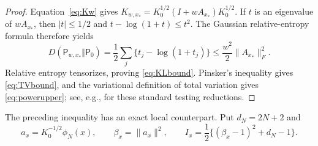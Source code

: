 \documentclass[11pt]{article}
\theoremstyle{definition}
\theoremstyle{remark}
\begin{document}
\begin{proof}
Equation~\eqref{eq:Kw} gives
$K_{w,x_*}=K_0^{1/2}(I+wA_{x_*})K_0^{1/2}$.  If $t$ is an eigenvalue of
$wA_{x_*}$, then
$|t|\leq1/2$ and $t-\log(1+t)\leq t^2$.  The Gaussian relative-entropy formula
therefore yields
\[
 D(\mathsf P_{w,x_*}\Vert\mathsf P_0)
 =\frac12\sum_j\{t_j-\log(1+t_j)\}
 \leq\frac{w^2}{2}\|A_{x_*}\|_F^2.
\]
Relative entropy tensorizes, proving \eqref{eq:KLbound}.  Pinsker's inequality
gives \eqref{eq:TVbound}, and the variational definition of total variation
gives \eqref{eq:powerupper}; see, e.g., \cite{Tsybakov2009} for these standard
testing reductions.
\end{proof}

The preceding inequality has an exact local counterpart.  Put
$d_N=2N+2$ and
\begin{equation}
 a_x=K_0^{-1/2}\phi_N(x),\qquad
 \beta_x=\|a_x\|^2,\qquad
 I_x=\frac12\bigl\{(\beta_x-1)^2+d_N-1\bigr\}.       \label{eq:LANinfo}
\end{equation}
\end{document}
